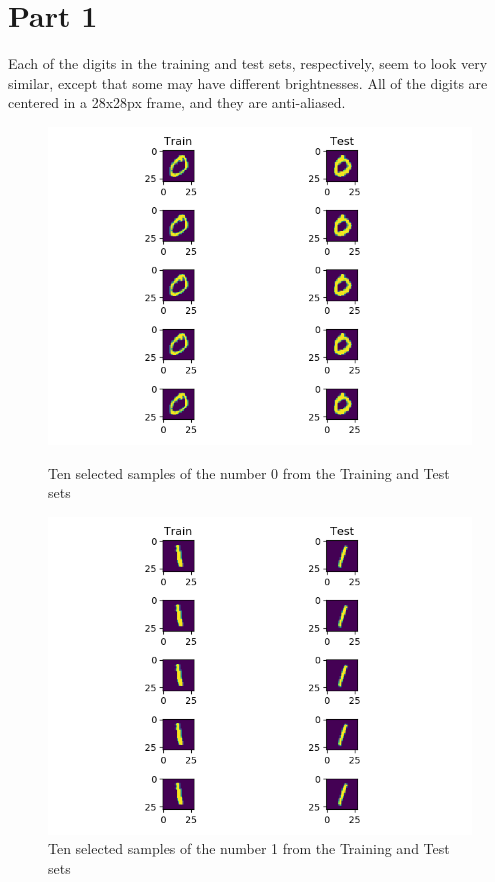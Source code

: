 \documentclass[10pt,letterpaper]{article}
\begin{document}
	\section{Part 1}
	Each of the digits in the training and test sets, respectively, seem to look very similar, except that some may have different brightnesses.
	All of the digits are centered in a 28x28px frame, and they are anti-aliased.
	\begin{figure}[H]
		\centering
		\includegraphics[width=\linewidth]{imgs/digit-0}
		\caption{Ten selected samples of the number 0 from the Training and Test sets}
		\label{fig:digit-0}
		\endminipage\hfill
		\centering
		\includegraphics[width=\linewidth]{imgs/digit-1}
		\caption{Ten selected samples of the number 1 from the Training and Test sets}
		\label{fig:digit-1}
		\endminipage\hfill
	\end{figure}
\end{document}
